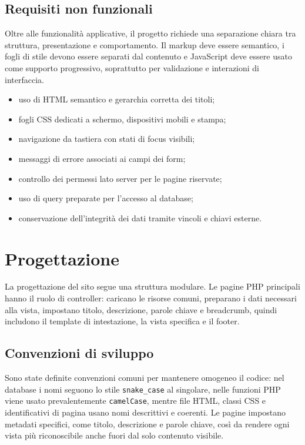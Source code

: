 ﻿\documentclass{article}
\begin{document}
\subsection{Requisiti non funzionali}
Oltre alle funzionalità applicative, il progetto richiede una separazione chiara tra struttura, presentazione e comportamento. Il markup deve essere semantico, i fogli di stile devono essere separati dal contenuto e JavaScript deve essere usato come supporto progressivo, soprattutto per validazione e interazioni di interfaccia.

\begin{itemize}
    \item uso di HTML semantico e gerarchia corretta dei titoli;
    \item fogli CSS dedicati a schermo, dispositivi mobili e stampa;
    \item navigazione da tastiera con stati di focus visibili;
    \item messaggi di errore associati ai campi dei form;
    \item controllo dei permessi lato server per le pagine riservate;
    \item uso di query preparate per l'accesso al database;
    \item conservazione dell'integrità dei dati tramite vincoli e chiavi esterne.
\end{itemize}

\newpage

\section{Progettazione}
La progettazione del sito segue una struttura modulare. Le pagine PHP principali hanno il ruolo di controller: caricano le risorse comuni, preparano i dati necessari alla vista, impostano titolo, descrizione, parole chiave e breadcrumb, quindi includono il template di intestazione, la vista specifica e il footer.

\subsection{Convenzioni di sviluppo}
Sono state definite convenzioni comuni per mantenere omogeneo il codice: nel database i nomi seguono lo stile \texttt{snake\_case} al singolare, nelle funzioni PHP viene usato prevalentemente \texttt{camelCase}, mentre file HTML, classi CSS e identificativi di pagina usano nomi descrittivi e coerenti. Le pagine impostano metadati specifici, come titolo, descrizione e parole chiave, così da rendere ogni vista più riconoscibile anche fuori dal solo contenuto visibile.
\end{document}
